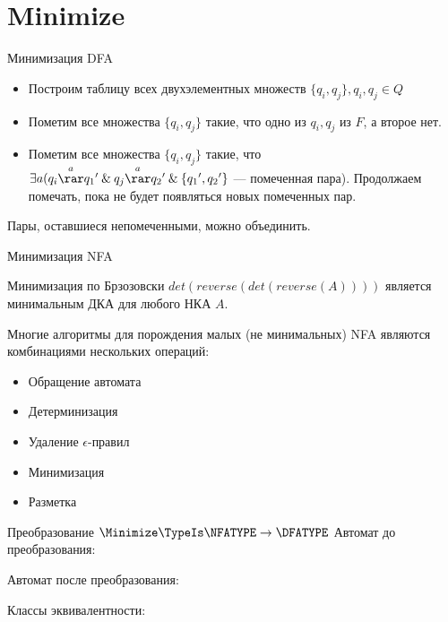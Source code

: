 \section{Minimize}
\begin{frame}{Минимизация DFA}
    \begin{itemize}
        \item Построим таблицу всех двухэлементных множеств $\{q_i, q_j\}, q_i, q_j \in Q$
        \item Пометим все множества $\{q_i, q_j\}$ такие, что одно из $q_i, q_j$ из $F$, а второе нет.
        \item Пометим все множества $\{q_i, q_j\}$ такие, что $\exists a({q_i}\overset{a}{\rar}{q_1}' \: \& \: {q_j}\overset{a}{\rar}{q_2}' \: \& \: \{{q_1}', {q_2}'\}$ — помеченная пара). Продолжаем помечать, пока не будет появляться новых помеченных пар.
    \end{itemize}
    Пары, оставшиеся непомеченными, можно объединить.
\end{frame}
\begin{frame}{Минимизация NFA}
    \begin{block}{Минимизация по Брзозовски}
        $det(reverse(det(reverse(A))))$ является минимальным ДКА для любого НКА $A$.
    \end{block}
    Многие алгоритмы для порождения малых (не минимальных) NFA являются комбинациями нескольких операций:
    \begin{itemize}
        \item Обращение автомата
        \item Детерминизация
        \item Удаление $\epsilon$-правил
        \item Минимизация
        \item Разметка
    \end{itemize}
\end{frame}
\begin{frame}{Преобразование $\Minimize\TypeIs\NFATYPE\to\DFATYPE$}
	Автомат до преобразования:




	Автомат после преобразования:%


	Классы эквивалентности:




\end{frame}
